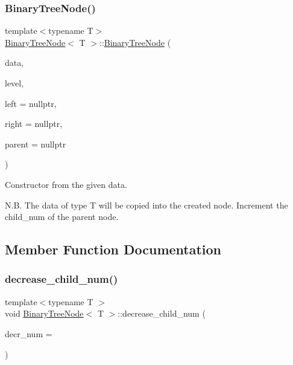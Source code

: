 \subsubsection{\texorpdfstring{Binary\+Tree\+Node()}{BinaryTreeNode()}\hspace{0.1cm}{\footnotesize\ttfamily [3/3]}}
{\footnotesize\ttfamily template$<$typename T$>$ \\
\hyperlink{classBinaryTreeNode}{Binary\+Tree\+Node}$<$ T $>$\+::\hyperlink{classBinaryTreeNode}{Binary\+Tree\+Node} (\begin{DoxyParamCaption}\item[{const T \&}]{data,  }\item[{unsigned int}]{level,  }\item[{\hyperlink{classBinaryTreeNode}{Binary\+Tree\+Node}$<$ T $>$ $\ast$}]{left = {\ttfamily nullptr},  }\item[{\hyperlink{classBinaryTreeNode}{Binary\+Tree\+Node}$<$ T $>$ $\ast$}]{right = {\ttfamily nullptr},  }\item[{\hyperlink{classBinaryTreeNode}{Binary\+Tree\+Node}$<$ T $>$ $\ast$}]{parent = {\ttfamily nullptr} }\end{DoxyParamCaption})}

Constructor from the given data.

N.\+B. The data of type {\ttfamily T} will be copied into the created node. Increment the {\ttfamily child\+\_\+num} of the parent node.

\subsection{Member Function Documentation}
\mbox{\label{classBinaryTreeNode_a05dfef5724e65a69494ac91d40852bde}} 
\subsubsection{\texorpdfstring{decrease\+\_\+child\+\_\+num()}{decrease\_child\_num()}}
{\footnotesize\ttfamily template$<$typename T $>$ \\
void \hyperlink{classBinaryTreeNode}{Binary\+Tree\+Node}$<$ T $>$\+::decrease\+\_\+child\+\_\+num (\begin{DoxyParamCaption}\item[{const unsigned int}]{decr\+\_\+num = {} }\end{DoxyParamCaption})}

